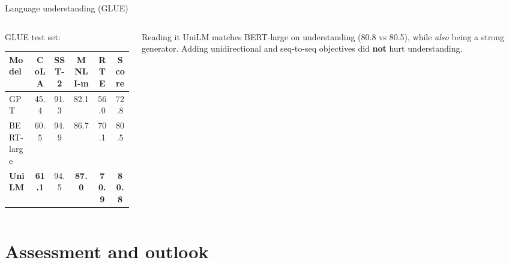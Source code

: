 \documentclass[aspectratio=169,11pt]{beamer}
\begin{document}
\begin{frame}{Language understanding (GLUE)}
  \begin{columns}[T]
    \begin{column}{0.58\textwidth}
      \footnotesize
      GLUE test set:
      \vspace{1mm}

      \begin{tabular}{@{}lccccc@{}}
        \toprule
        Model & CoLA & SST-2 & MNLI-m & RTE & Score\\
        \midrule
        GPT & 45.4 & 91.3 & 82.1 & 56.0 & 72.8\\
        BERT-large & 60.5 & 94.9 & 86.7 & 70.1 & 80.5\\
        \textbf{UniLM} & \textbf{61.1} & 94.5 & \textbf{87.0} & \textbf{70.9} & \textbf{80.8}\\
        \bottomrule
      \end{tabular}
    \end{column}
    \begin{column}{0.38\textwidth}
      \begin{exampleblock}{Reading it}
        \small
        UniLM matches BERT-large on understanding (80.8 vs 80.5), while \emph{also} being a strong generator.
        Adding unidirectional and seq-to-seq objectives did \textbf{not} hurt understanding.
      \end{exampleblock}
    \end{column}
  \end{columns}
\end{frame}

\section{Assessment and outlook}
\end{document}
